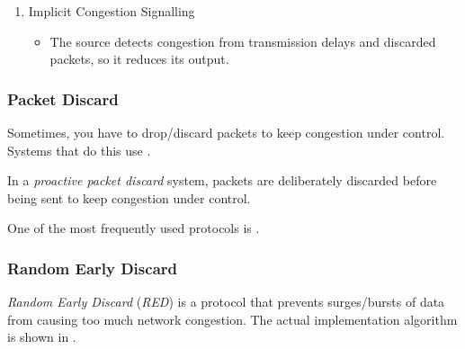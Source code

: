 \begin{definition}
\begin{enumerate}[noitemsep]
\item Implicit Congestion Signalling
  \begin{itemize}[noitemsep]
  \item The source detects congestion from transmission delays and discarded packets, so it reduces its output.
  \end{itemize}
\end{enumerate}

\subsubsection{Packet Discard}\label{subsubsec:Packet_Discard}
Sometimes, you have to drop/discard packets to keep congestion under control.
Systems that do this use .

\begin{definition}\label{def:Proactive_Packet_Discard}
  In a \emph{proactive packet discard} system, packets are deliberately discarded before being sent to keep congestion under control.
\end{definition}

One of the most frequently used protocols is .

\subsubsection{Random Early Discard}\label{subsubsec:Random_Early_Discard}
\begin{definition}\label{def:Random_Early_Discard}
  \emph{Random Early Discard} (\emph{RED}) is a protocol that prevents surges/bursts of data from causing too much network congestion.
  The actual implementation algorithm is shown in .
\end{definition}


\end{definition}
